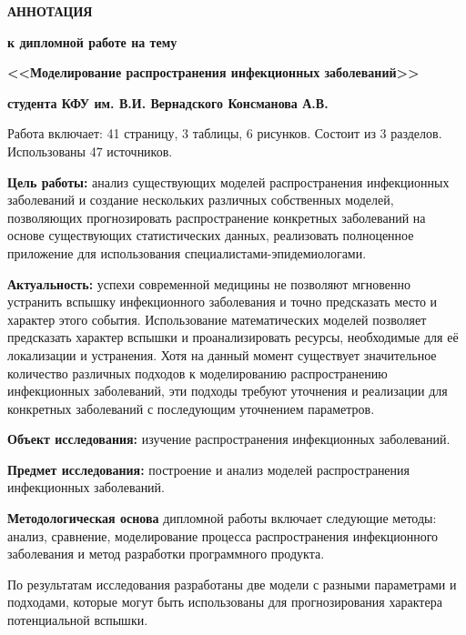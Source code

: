 \documentclass[a4paper,14pt,russian]{extreport}	%
\begin{document}
	\begin{center}
		\textbf{АННОТАЦИЯ}
		
		\textbf{к дипломной работе на тему}
		
		\textbf{<<Моделирование распространения инфекционных заболеваний>> }
		
		\textbf{студента КФУ им. В.И. Вернадского Консманова А.В.}
	\end{center}

Работа включает: 41 страницу, 3 таблицы, 6 рисунков. Состоит из 3 разделов. Использованы 47 источников. 

\textbf{Цель работы:} анализ существующих моделей распространения инфекционных заболеваний и  создание нескольких различных собственных моделей, позволяющих прогнозировать распространение конкретных заболеваний на основе существующих статистических данных, реализовать полноценное приложение для использования  специалистами-эпидемиологами.

\textbf{Актуальность:} успехи современной медицины не позволяют мгновенно устранить вспышку инфекционного заболевания и точно предсказать место и характер этого события. Использование математических моделей позволяет предсказать характер вспышки и проанализировать ресурсы, необходимые для её локализации и устранения. Хотя на данный момент существует значительное  количество различных подходов к моделированию распространению инфекционных заболеваний, эти подходы требуют уточнения и реализации для конкретных заболеваний с последующим уточнением параметров.

\textbf{Объект исследования:} изучение распространения инфекционных заболеваний.

\textbf{Предмет исследования:} построение и анализ моделей распространения инфекционных заболеваний.

\textbf{Методологическая основа} дипломной работы включает следующие методы: анализ, сравнение, моделирование процесса распространения инфекционного заболевания и метод разработки программного продукта.

По результатам исследования разработаны две модели с разными параметрами и подходами, которые могут быть использованы для прогнозирования характера потенциальной вспышки.
\end{document}
